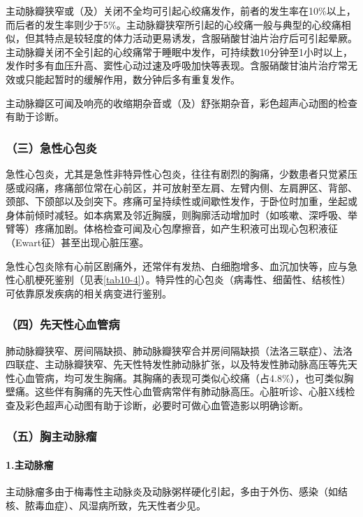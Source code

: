 主动脉瓣狭窄或（及）关闭不全均可引起心绞痛发作，前者的发生率在10\%以上，而后者的发生率则少于5\%。主动脉瓣狭窄所引起的心绞痛一般与典型的心绞痛相似，但其特点是较轻度的体力活动更易诱发，含服硝酸甘油片治疗后可引起晕厥。主动脉瓣关闭不全引起的心绞痛常于睡眠中发作，可持续数10分钟至1小时以上，发作时多有血压升高、窦性心动过速及呼吸加快等表现。含服硝酸甘油片治疗常无效或只能起暂时的缓解作用，数分钟后多有重复发作。

主动脉瓣区可闻及响亮的收缩期杂音或（及）舒张期杂音，彩色超声心动图的检查有助于诊断。

\subsubsection{（三）急性心包炎}

急性心包炎，尤其是急性非特异性心包炎，往往有剧烈的胸痛，少数患者只觉紧压感或闷痛，疼痛部位常在心前区，并可放射至左肩、左臂内侧、左肩胛区、背部、颈部、下颌部以及剑突下。疼痛可呈持续性或间歇性发作，于卧位时加重，坐起或身体前倾时减轻。如本病累及邻近胸膜，则胸廓活动增加时（如咳嗽、深呼吸、举臂等）疼痛加剧。体格检查可闻及心包摩擦音，如产生积液可出现心包积液征（Ewart征）甚至出现心脏压塞。

急性心包炎除有心前区剧痛外，还常伴有发热、白细胞增多、血沉加快等，应与急性心肌梗死鉴别（见表\ref{tab10-4}）。特异性的心包炎（病毒性、细菌性、结核性）可依靠原发疾病的相关病变进行鉴别。

\subsubsection{（四）先天性心血管病}

肺动脉瓣狭窄、房间隔缺损、肺动脉瓣狭窄合并房间隔缺损（法洛三联症）、法洛四联症、主动脉瓣狭窄、先天性特发性肺动脉扩张，以及特发性肺动脉高压等先天性心血管病，均可发生胸痛。其胸痛的表现可类似心绞痛（占4.8\%），也可类似胸壁痛。这些伴有胸痛的先天性心血管病常伴有肺动脉高压。心脏听诊、心脏X线检查及彩色超声心动图有助于诊断，必要时可做心血管造影以明确诊断。

\subsubsection{（五）胸主动脉瘤}

\paragraph{1.主动脉瘤}

主动脉瘤多由于梅毒性主动脉炎及动脉粥样硬化引起，多由于外伤、感染（如结核、脓毒血症）、风湿病所致，先天性者少见。

